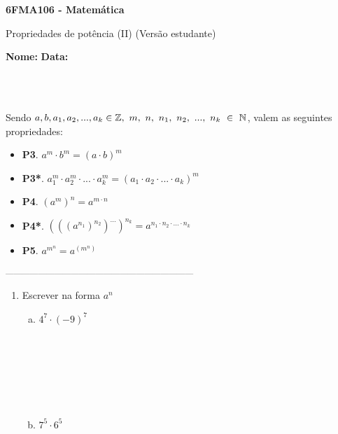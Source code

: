 \documentclass[a4paper,14pt]{article}
\begin{document}
	
	\noindent\textbf{6FMA106 - Matemática} 
	
	\begin{center}Propriedades de potência (II) (Versão estudante)
	\end{center}
	
	\noindent\textbf{Nome:} \underline{\hspace{10cm}}
	\noindent\textbf{Data:} \underline{\hspace{4cm}}
	
	~ \\ ~
	\begin{multicols}{2}
		\noindent Sendo $a, b, a_1, a_2, ..., a_k \in \mathbb{Z},~m,~n,~n_1, \\ ~n_2,~...,~n_k~ \in~\mathbb{N}$, valem as seguintes propriedades: \\
		\begin{itemize}
			\item \textbf{P3}. $a^m \cdot b^m = (a \cdot b)^m$
			\item \textbf{P3*}. $a_1^m \cdot a_2^m \cdot ... \cdot a_k^m = (a_1 \cdot a_2 \cdot ... \cdot a_k)^m$
			\item \textbf{P4}. $(a^m)^n = a^{m \cdot n}$
			\item \textbf{P4*}. $(((a^{n_1})^{n_2})^{...})^{n_k} = a^{n_1 \cdot n_2 \cdot ... \cdot n_k}$
			\item \textbf{P5}. $a^{m^{n}} = a^{(m^{n})}$
		\end{itemize}
	\textsubscript{---------------------------------------------------------------------}
    	\begin{enumerate}
    		\item Escrever na forma $a^n$
    		\begin{enumerate}[a)]
    			\item $4^7 \cdot (-9)^7$ \\\\\\\\\\\\\\
    			\item $7^5 \cdot 6^5$ \\\\\\\\\\\\

\end{enumerate}
\end{enumerate}
\end{multicols}
\end{document}
